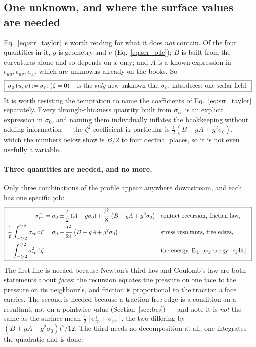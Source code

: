 \documentclass[11pt]{article}
\begin{document}
\subsection{One unknown, and where the surface values are needed}
\label{sec:srr_reduce}
Eq.~\eqref{eq:srr_taylor} is worth reading for what it does \emph{not} contain.
Of the four quantities in it, $g$ is geometry and $\nu$
(Eq.~\ref{eq:srr_ode}); $B$ is built from the curvatures alone and so depends on
$x$ only; and $A$ is a known expression in
$\bar\epsilon_{uu}, \bar\epsilon_{uv}, \bar\epsilon_{vv}$, which are unknowns
already on the books. So
\begin{equation}\label{eq:srr_one_unknown}
    \boxed{\;\sigma_{0}\left(u,v\right) := \sigma_{rr}\left(\zeta=0\right)
    \quad\text{is the \emph{only} new unknown that }\sigma_{rr}\text{ introduces:
    one scalar field.}\;}
\end{equation}
It is worth resisting the temptation to name the coefficients of
Eq.~\eqref{eq:srr_taylor} separately. Every through-thickness quantity built from
$\sigma_{rr}$ is an explicit expression in $\sigma_{0}$, and naming them
individually inflates the bookkeeping without adding information --- the
$\zeta^{2}$ coefficient in particular is $\tfrac12\left(B + gA
+ g^{2}\sigma_{0}\right)$, which the numbers below show is $B/2$ to four decimal
places, so it is not even usefully a variable.

\paragraph{Three quantities are needed, and no more.} Only three combinations of
the profile appear anywhere downstream, and each has one specific job:
\begin{equation}\label{eq:srr_dictionary}
    \boxed{\;
    \begin{aligned}
    \sigma_{rr}^{\pm}
      &= \sigma_{0} \pm \frac{t}{2}\left(A + g\sigma_{0}\right)
        + \frac{t^{2}}{8}\left(B + gA + g^{2}\sigma_{0}\right)
      &&\text{contact recursion, friction law},\\
    \frac{1}{t}\int_{-t/2}^{t/2}\sigma_{rr}\,\mathrm d\zeta
      &= \sigma_{0} + \frac{t^{2}}{24}
        \left(B + gA + g^{2}\sigma_{0}\right)
      &&\text{stress resultants, free edges},\\
    \int_{-t/2}^{t/2}\sigma_{rr}^{2}\,\mathrm d\zeta
      && &\text{the energy, Eq.~\eqref{eq:energy_split}}.
    \end{aligned}\;}
\end{equation}
The first line is needed because Newton's third law and Coulomb's law are both
statements about \emph{faces}: the recursion equates the pressure on one face to
the pressure on its neighbour's, and friction is proportional to the traction a
face carries. The second is needed because a traction-free edge is a condition on
a resultant, not on a pointwise value (Section~\ref{sec:bcs}) --- and note it is
\emph{not} the same as the surface mean
$\tfrac12\left[\sigma_{rr}^{+}+\sigma_{rr}^{-}\right]$, the two differing by
$\left(B+gA+g^{2}\sigma_{0}\right)t^{2}/12$. The third needs no decomposition at
all; one integrates the quadratic and is done.
\end{document}
